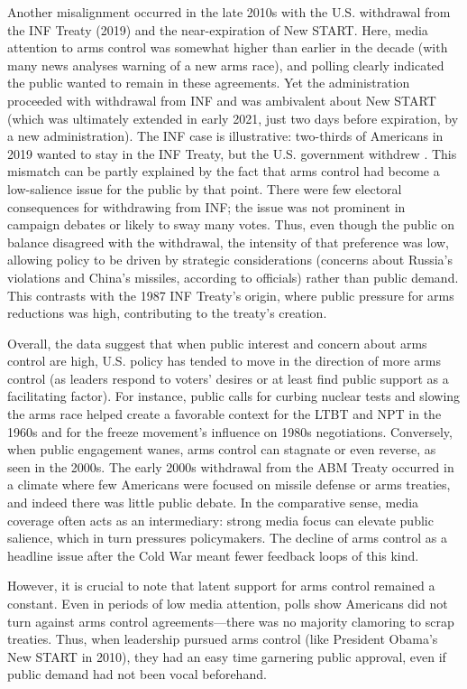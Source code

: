 \documentclass[11,5 pt]{article}
\begin{document}
    Another misalignment occurred in the late 2010s with the U.S. withdrawal from the INF Treaty (2019) and the near-expiration of New START. Here, media attention to arms control was somewhat higher than earlier in the decade (with many news analyses warning of a new arms race), and polling clearly indicated the public wanted to remain in these agreements. Yet the administration proceeded with withdrawal from INF and was ambivalent about New START (which was ultimately extended in early 2021, just two days before expiration, by a new administration). The INF case is illustrative: two-thirds of Americans in 2019 wanted to stay in the INF Treaty, but the U.S. government withdrew \cite{DefenseOne2019}. This mismatch can be partly explained by the fact that arms control had become a low-salience issue for the public by that point. There were few electoral consequences for withdrawing from INF; the issue was not prominent in campaign debates or likely to sway many votes. Thus, even though the public on balance disagreed with the withdrawal, the intensity of that preference was low, allowing policy to be driven by strategic considerations (concerns about Russia’s violations and China’s missiles, according to officials) rather than public demand. This contrasts with the 1987 INF Treaty’s origin, where public pressure for arms reductions was high, contributing to the treaty’s creation. 
    
    Overall, the data suggest that when public interest and concern about arms control are high, U.S. policy has tended to move in the direction of more arms control (as leaders respond to voters’ desires or at least find public support as a facilitating factor). For instance, public calls for curbing nuclear tests and slowing the arms race helped create a favorable context for the LTBT and NPT in the 1960s and for the freeze movement’s influence on 1980s negotiations. Conversely, when public engagement wanes, arms control can stagnate or even reverse, as seen in the 2000s. The early 2000s withdrawal from the ABM Treaty occurred in a climate where few Americans were focused on missile defense or arms treaties, and indeed there was little public debate. In the comparative sense, media coverage often acts as an intermediary: strong media focus can elevate public salience, which in turn pressures policymakers. The decline of arms control as a headline issue after the Cold War meant fewer feedback loops of this kind. 
    
    However, it is crucial to note that latent support for arms control remained a constant. Even in periods of low media attention, polls show Americans did not turn against arms control agreements—there was no majority clamoring to scrap treaties. Thus, when leadership pursued arms control (like President Obama’s New START in 2010), they had an easy time garnering public approval, even if public demand had not been vocal beforehand. 
    
\end{document}
